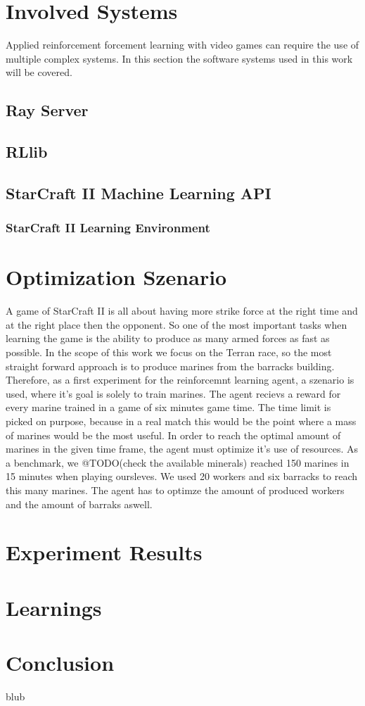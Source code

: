 \documentclass[12pt,a4paper]{article}
\begin{document}
\section{Involved Systems}
Applied reinforcement forcement learning with video games can require the use of multiple complex systems. In this section the software systems used in this work will be covered.
\subsection{Ray Server}
\subsection{RLlib}
\subsection{StarCraft II Machine Learning API}
\label{sec:SC2API}
\subsubsection{StarCraft II Learning Environment}
\section{Optimization Szenario}
A game of StarCraft II is all about having more strike force at the right time and at the right place then the opponent.
So one of the most important tasks when learning the game is the ability to produce as many armed forces as fast as possible.
In the scope of this work we focus on the Terran race, so the most straight forward approach is to produce marines from the barracks building.
Therefore, as a first experiment for the reinforcemnt learning agent, a szenario is used, where it's goal is solely to train marines.
The agent recievs a reward for every marine trained in a game of six minutes game time. The time limit is picked on purpose, because in a real match this would be the point where a mass of marines would be the most useful.
In order to reach the optimal amount of marines in the given time frame, the agent must optimize it's use of resources.
As a benchmark, we @TODO(check the available minerals) reached 150 marines in 15 minutes when playing oursleves. We used 20 workers and six barracks to reach this many marines.
The agent has to optimze the amount of produced workers and the amount of barraks aswell. 
\section{Experiment Results}
\section{Learnings}
\section{Conclusion}
blub\cite{Mnih2016}
\begin{appendix}
    \listoffigures
    \listoftables
    
\end{appendix}


\end{document}
